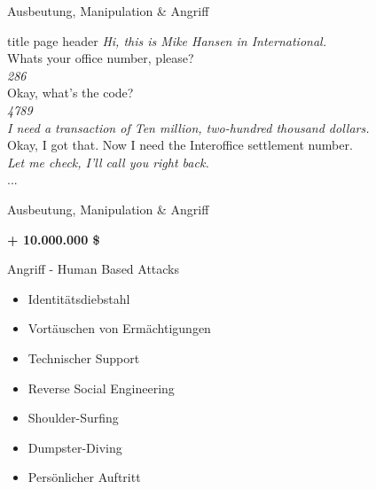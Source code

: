 \documentclass[11pt]{beamer}
\begin{document}
\begin{frame}{Ausbeutung, Manipulation \& Angriff}

\begin{beamercolorbox}[sep=1em]{title page header}
\textcolor{skyblue3}{\textit{\glqq{}Hi, this is Mike Hansen in International.\grqq{}}}\\

\glqq{}Whats your office number, please?\grqq{}\\

\textcolor{skyblue3}{\textit{\glqq{}286\grqq{}}}\\

\glqq{}Okay, what's the code?\grqq{}\\

\textcolor{skyblue3}{\textit{\glqq{}4789\grqq{}}}\\

\textcolor{skyblue3}{\textit{\glqq{}I need a transaction of Ten million, two-hundred thousand
dollars.\grqq{}}}\\

\glqq{}Okay, I got that. Now I need the Interoffice settlement number.\grqq{}\\

\textcolor{skyblue3}{\textit{\glqq{}Let me check, I'll call you right
back.\grqq{}}}\\
...

\end{beamercolorbox}
\end{frame}

\begin{frame}{Ausbeutung, Manipulation \& Angriff}
  \begin{center}
  {\Huge \textbf{+ 10.000.000 \$}}
  \end{center}
\end{frame}

\begin{frame}{Angriff - Human Based Attacks}
  \begin{itemize}
    \item Identitätsdiebstahl
    \item Vortäuschen von Ermächtigungen
    \item Technischer Support
    \item Reverse Social Engineering
    \item Shoulder-Surfing
    \item Dumpster-Diving
    \item Persönlicher Auftritt
  \end{itemize}
\end{frame}
\end{document}

